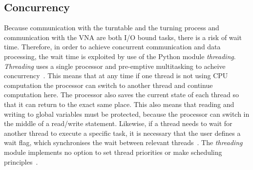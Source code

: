 \subsection{Concurrency}
Because communication with the turntable and the turning process and communication with the VNA are both I/O bound tasks, there is a risk of wait time. Therefore, in order to achieve concurrent communication and data processing, the wait time is exploited by use of the Python module \textit{threading}. \textit{Threading} uses a single processor and pre-emptive multitasking to acheive concurrency~\cite{concurrency}. This means that at any time if one thread is not using CPU computation the processor can switch to another thread and continue computation here. The processor also saves the current state of each thread so that it can return to the exact same place. This also means that reading and writing to global variables must be protected, because the processor can switch in the middle of a read/write statement. Likewise, if a thread needs to wait for another thread to execute a specific task, it is necessary that the user defines a wait flag, which synchronises the wait between relevant threads~\cite{concurrency}. The \textit{threading} module implements no option to set thread priorities or make scheduling principles~\cite{threading}.



